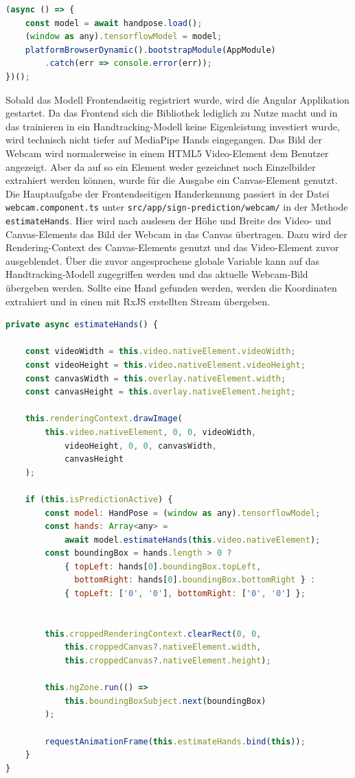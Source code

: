 \documentclass[11pt,bibliography=totocnumbered]{scrartcl}
\begin{document}
\begin{lstlisting}[language=javascript,firstnumber=16,caption={Laden der frontendseitigen MediaPipe Hands Modelle.},label=lst:loading_mediapipe_hands_models]
(async () => {
	const model = await handpose.load();
	(window as any).tensorflowModel = model;
	platformBrowserDynamic().bootstrapModule(AppModule)
		.catch(err => console.error(err));
})();
\end{lstlisting}
Sobald das Modell Frontendseitig registriert wurde, wird die Angular Applikation gestartet. Da das Frontend sich die Bibliothek lediglich zu Nutze macht und in das trainieren in ein Handtracking-Modell keine Eigenleistung investiert wurde, wird technisch nicht tiefer auf MediaPipe Hands eingegangen. Das Bild der Webcam wird normalerweise in einem HTML5 Video-Element dem Benutzer angezeigt. Aber da auf so ein Element weder gezeichnet noch Einzelbilder extrahiert werden können, wurde für die Ausgabe ein Canvas-Element genutzt. Die Hauptaufgabe der Frontendseitigen Handerkennung passiert in der Datei \lstinline[language=pythoninline]|webcam.component.ts| unter \lstinline[language=pythoninline]|src/app/sign-prediction/webcam/| in der Methode \lstinline[language=pythoninline]|estimateHands|. Hier wird nach auslesen der Höhe und Breite des Video- und Canvas-Elements das Bild der Webcam in das Canvas übertragen. Dazu wird der Rendering-Context des Canvas-Elements genutzt und das Video-Element zuvor ausgeblendet. Über die zuvor angesprochene globale Variable kann auf das Handtracking-Modell zugegriffen werden und das aktuelle Webcam-Bild übergeben werden. Sollte eine Hand gefunden werden, werden die Koordinaten extrahiert und in einen mit RxJS erstellten Stream übergeben.
\begin{lstlisting}[language=javascript,firstnumber=124,caption={Erkennen einer Hand mit MediaPipe Hands.},label=lst:estimate_hands]
private async estimateHands() {

	const videoWidth = this.video.nativeElement.videoWidth;
	const videoHeight = this.video.nativeElement.videoHeight;
	const canvasWidth = this.overlay.nativeElement.width;
	const canvasHeight = this.overlay.nativeElement.height;
	
	this.renderingContext.drawImage(
		this.video.nativeElement, 0, 0, videoWidth, 
			videoHeight, 0, 0, canvasWidth,
			canvasHeight
	);
	
	if (this.isPredictionActive) {
		const model: HandPose = (window as any).tensorflowModel;
		const hands: Array<any> = 
			await model.estimateHands(this.video.nativeElement);
		const boundingBox = hands.length > 0 ?
			{ topLeft: hands[0].boundingBox.topLeft, 
			  bottomRight: hands[0].boundingBox.bottomRight } :
			{ topLeft: ['0', '0'], bottomRight: ['0', '0'] };
	
	
		this.croppedRenderingContext.clearRect(0, 0,
			this.croppedCanvas?.nativeElement.width,
			this.croppedCanvas?.nativeElement.height);
			
		this.ngZone.run(() =>
			this.boundingBoxSubject.next(boundingBox)
		);
	
		requestAnimationFrame(this.estimateHands.bind(this));
	}
}
\end{lstlisting}
\end{document}
